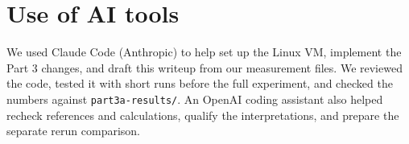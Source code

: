 \documentclass[11pt]{article}
\begin{document}
\section*{Use of AI tools}

We used Claude Code (Anthropic) to help set up the Linux VM, implement the
Part 3 changes, and draft this writeup from our measurement files. We
reviewed the code, tested it with short runs before the full experiment, and
checked the numbers against \texttt{part3a-results/}.
An OpenAI coding assistant also helped recheck references and calculations,
qualify the interpretations, and prepare the separate rerun comparison.
\end{document}
